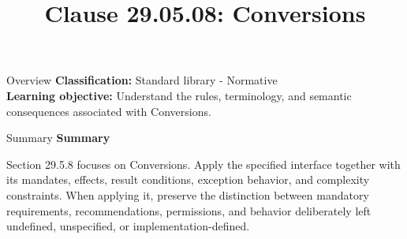 \documentclass[10pt,letterpaper]{article}
\title{Clause 29.05.08: Conversions}
\author{}
\date{}
\begin{document}
\maketitle
\begin{CornellOverviewBox}{Overview}
\textbf{Classification:} Standard library - Normative\\[2pt]
\textbf{Learning objective:} Understand the rules, terminology, and semantic consequences associated with Conversions.
\end{CornellOverviewBox}\begin{CornellSummaryBox}{Summary}
{\sffamily\bfseries\color{Accent} Summary}\par\vspace{3pt}Section 29.5.8 focuses on Conversions. Apply the specified interface together with its mandates, effects, result conditions, exception behavior, and complexity constraints. When applying it, preserve the distinction between mandatory requirements, recommendations, permissions, and behavior deliberately left undefined, unspecified, or implementation-defined.
\end{CornellSummaryBox}
\end{document}
